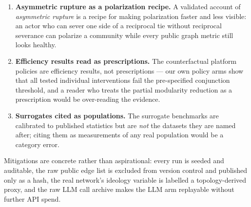 \begin{enumerate}
    \item \textbf{Asymmetric rupture as a polarization recipe.} A validated account of
    \emph{asymmetric rupture} is a recipe for making polarization faster and less visible:
    an actor who can sever one side of a reciprocal tie without reciprocal severance can
    polarize a community while every public graph metric still looks healthy.
    \item \textbf{Efficiency results read as prescriptions.} The counterfactual platform
    policies are efficiency results, not prescriptions --- our own policy arms show that all
    tested individual interventions fail the pre-specified conjunction threshold, and a reader who treats
    the partial modularity reduction as a prescription would be over-reading the evidence.
    \item \textbf{Surrogates cited as populations.} The surrogate benchmarks are calibrated to
    published statistics but are \emph{not} the datasets they are named after; citing them as
    measurements of any real population would be a category error.
\end{enumerate}

Mitigations are concrete rather than aspirational: every run is seeded and auditable, the
raw public edge list is excluded from version control and published only as a hash, the real
network's ideology variable is labelled a topology-derived proxy, and the raw LLM call
archive makes the LLM arm replayable without further API spend.
